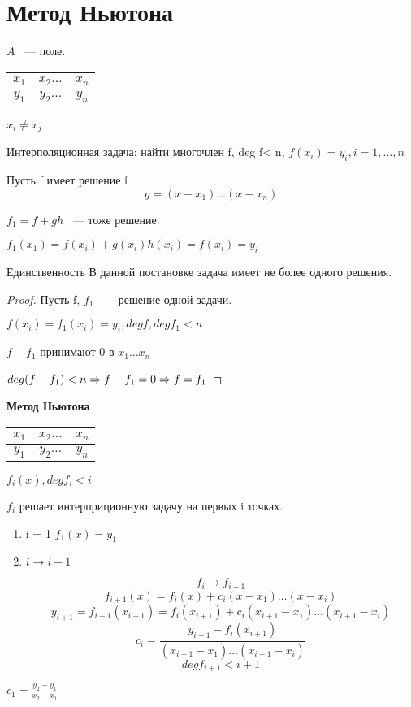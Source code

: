 ﻿\section{Метод Ньютона}
\begin{Def}
$A$ ~--- поле.
\begin{tabular}{c|c|c}
$x_1$ & $x_2 \ldots$ & $x_n$\\
\hline
$y_1$ & $y_2 \ldots$ & $y_n$\\
\end{tabular}

$x_i \ne x_j$

Интерполяционная задача: найти многочлен f, deg f< n, $f(x_i) = y_i, i = 1, \ldots, n$

Пусть f имеет решение f
$$g = (x - x_1) \ldots (x - x_n)$$

$f_1 = f + gh$ ~--- тоже решение.

$f_1(x_1) = f(x_i) + g(x_i)h(x_i) = f(x_i) = y_i$

\end{Def}

\begin{theorem}{Единственность}
В данной постановке задача имеет не более одного решения. 
\end{theorem}

\begin{proof}
Пусть f, $f_1$ ~--- решение одной задачи.

$f(x_i) = f_1(x_i) = y_i, deg f, deg f_1 < n$

$f - f_1$ принимают 0 в $x_1 \ldots x_n$

$deg(f - f_1) < n \Rightarrow f - f_1 = 0 \Rightarrow f = f_1$
\end{proof}

{\bf Метод Ньютона}   
\begin{tabular}{c|c|c}
$x_1$ & $x_2 \ldots$ & $x_n$\\
\hline
$y_1$ & $y_2 \ldots$ & $y_n$\\
\end{tabular}
$f_i(x), deg f_i < i$

$f_i$ решает интерприционную задачу на первых i точках.

\begin{enumerate}
\item i = 1
   $f_1(x) = y_1$
\item $i \to i + 1$

$$f_i \to f_{i + 1}$$
$$f_{i + 1}(x) = f_i(x) + c_i(x - x_1)\ldots(x - x_i)$$
$$y_{i + 1} = f_{i + 1}(x_{i + 1}) = f_i(x_{i + 1}) + c_i(x_{i + 1} - x_1) \ldots (x_{i + 1} - x_i)$$
$$c_i = \frac{y_{i + 1} - f_i(x_{i + 1})}{(x_{i + 1} - x_{1}) \ldots (x_{i + 1} - x_{i})}$$
$$deg f_{i + 1} < i + 1$$

\end{enumerate}



\begin{Rem}
$c_1 = \frac{y_2 - y_1}{x_2 - x_1}$
\end{Rem}

                    
